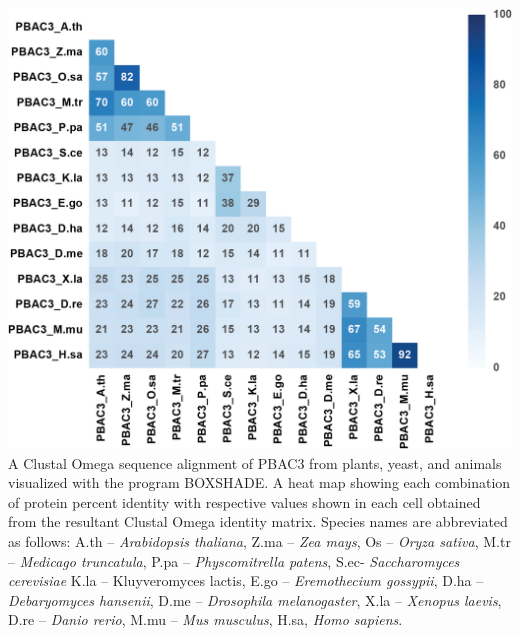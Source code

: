 \begin{FPfigure}
	\ContinuedFloat
	\centering
	\includegraphics[width=\columnwidth]{Proteasome/pbac3align2.png}
	{A Clustal Omega \citep{sievers14} sequence alignment of PBAC3 from plants, yeast, and animals visualized with the program BOXSHADE. A heat map showing each combination of protein percent identity with respective values shown in each cell obtained from the resultant Clustal Omega identity matrix. Species names are abbreviated as follows: A.th – \textit{Arabidopsis thaliana}, Z.ma – \textit{Zea mays}, Os – \textit{Oryza sativa}, M.tr – \textit{Medicago truncatula}, P.pa – \textit{Physcomitrella patens}, S.ec- \textit{Saccharomyces cerevisiae} K.la – {Kluyveromyces lactis}, E.go – \textit{Eremothecium gossypii}, D.ha – \textit{Debaryomyces hansenii}, D.me – \textit{Drosophila melanogaster}, X.la – \textit{Xenopus laevis}, D.re – \textit{Danio rerio}, M.mu – \textit{Mus musculus}, H.sa, \textit{Homo sapiens}.}
	\label{fig:pbac3align2}
\end{FPfigure}
\clearpage

